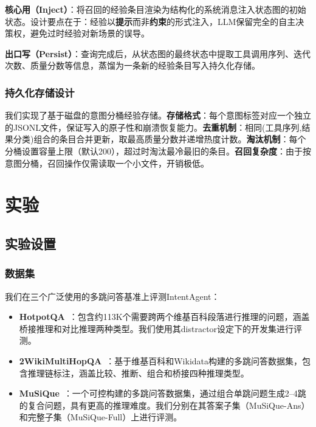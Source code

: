 \documentclass[runningheads]{llncs}
\begin{document}
\textbf{核心用（Inject）}：将召回的经验条目渲染为结构化的系统消息注入状态图的初始状态。设计要点在于：经验以\textbf{提示}而非\textbf{约束}的形式注入，LLM保留完全的自主决策权，避免过时经验对新场景的误导。

\textbf{出口写（Persist）}：查询完成后，从状态图的最终状态中提取工具调用序列、迭代次数、质量分数等信息，蒸馏为一条新的经验条目写入持久化存储。

\subsubsection{持久化存储设计}

我们实现了基于磁盘的意图分桶经验存储。\textbf{存储格式}：每个意图标签对应一个独立的JSONL文件，保证写入的原子性和崩溃恢复能力。\textbf{去重机制}：相同(工具序列,结果分类)组合的条目合并更新，取最高质量分数并递增热度计数。\textbf{淘汰机制}：每个分桶设置容量上限（默认200），超过时淘汰最冷最旧的条目。\textbf{召回复杂度}：由于按意图分桶，召回操作仅需读取一个小文件，开销极低。

\section{实验}

\subsection{实验设置}

\subsubsection{数据集}

我们在三个广泛使用的多跳问答基准上评测IntentAgent：

\begin{itemize}[leftmargin=*]
    \item \textbf{HotpotQA}~\cite{ref20}：包含约113K个需要跨两个维基百科段落进行推理的问题，涵盖桥接推理和对比推理两种类型。我们使用其distractor设定下的开发集进行评测。
    \item \textbf{2WikiMultiHopQA}~\cite{ref21}：基于维基百科和Wikidata构建的多跳问答数据集，包含推理链标注，涵盖比较、推断、组合和桥接四种推理类型。
    \item \textbf{MuSiQue}~\cite{ref22}：一个可控构建的多跳问答数据集，通过组合单跳问题生成2--4跳的复合问题，具有更高的推理难度。我们分别在其答案子集（MuSiQue-Ans）和完整子集（MuSiQue-Full）上进行评测。
\end{itemize}
\end{document}
